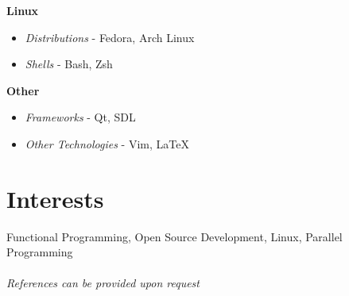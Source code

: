 \documentclass[10pt]{article} %
\begin{document}
\bf{Linux}
\begin{itemize}
\item \textit{Distributions} - Fedora, Arch Linux 
\item \textit{Shells} - Bash, Zsh
\end{itemize}

\bf{Other}
\begin{itemize}
\item \textit{Frameworks} - Qt, SDL
\item \textit{Other Technologies} - Vim, \LaTeX
\end{itemize}


\section{Interests}
Functional Programming, Open Source Development, Linux, Parallel Programming\\\\




\textit{References can be provided upon request}

\end{document}
